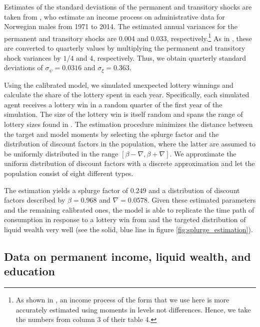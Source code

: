 \documentclass[\econtexRoot/HAFiscal]{subfiles}
\begin{document}
Estimates of the standard deviations of the permanent and transitory shocks are taken from \citet{crawley2022parsimonious}, who estimate an income process on administrative data for Norwegian males from 1971 to 2014. The estimated annual variances for the permanent and transitory shocks are 0.004 and 0.033, respectively.\footnote{As shown in \citet{crawley2022parsimonious}, an income process of the form that we use here is more accurately estimated using moments in levels not differences. Hence, we take the numbers from column 3 of their table 4.} As in \citet{carroll2020sticky}, these are converted to quarterly values by multiplying the permanent and transitory shock variances by $1/4$ and $4$, respectively. Thus, we obtain quarterly standard deviations of $\sigma_\psi=0.0316$ and $\sigma_\xi=0.363$.

Using the calibrated model, we simulated unexpected lottery winnings and calculate the share of the lottery spent in each year. Specifically, each simulated agent receives a lottery win in a random quarter of the first year of the simulation. The size of the lottery win is itself random and spans the range of lottery sizes found in \citet{fagereng_mpc_2021}. The estimation procedure minimizes the distance between the target and model moments by selecting the splurge factor and the distribution of discount factors in the population, where the latter are assumed to be uniformly distributed in the range $[\beta-\nabla, \beta+\nabla]$. We approximate the uniform distribution of discount factors with a discrete approximation and let the population consist of eight different types.

The estimation yields a splurge factor of $0.249$ and a distribution of discount factors described by $\beta = 0.968$ and $\nabla=0.0578$. Given these estimated parameters and the remaining calibrated ones, the model is able to replicate the time path of consumption in response to a lottery win from \citet{fagereng_mpc_2021} and the targeted distribution of liquid wealth very well (see the solid, blue line in figure \ref{fig:splurge_estimation}).



 

\hypertarget{data-on-permanent-income-liquid-wealth-and-education}{}\par\subsection{Data on permanent income, liquid wealth, and education}
\notinsubfile{\label{sec:SCFdata}}
\end{document}
